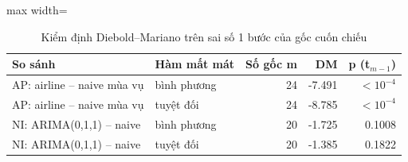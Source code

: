 \begin{table}[H]
\centering\footnotesize
\caption{Kiểm định Diebold–Mariano trên sai số 1 bước của gốc cuốn chiếu}\label{tab:tab_b12_13_diebold_mariano}
\begin{adjustbox}{max width=\linewidth}
\begin{tabular}{|l|l|r|r|r|}
\toprule
So sánh & Hàm mất mát & Số gốc m & DM & p (t$_{m-1}$) \\
\midrule
AP: airline – naive mùa vụ & bình phương & 24 & -7.491 & $<10^{-4}$ \\
AP: airline – naive mùa vụ & tuyệt đối & 24 & -8.785 & $<10^{-4}$ \\
NI: ARIMA(0,1,1) – naive & bình phương & 20 & -1.725 & 0.1008 \\
NI: ARIMA(0,1,1) – naive & tuyệt đối & 20 & -1.385 & 0.1822 \\
\bottomrule
\end{tabular}
\end{adjustbox}
\end{table}
